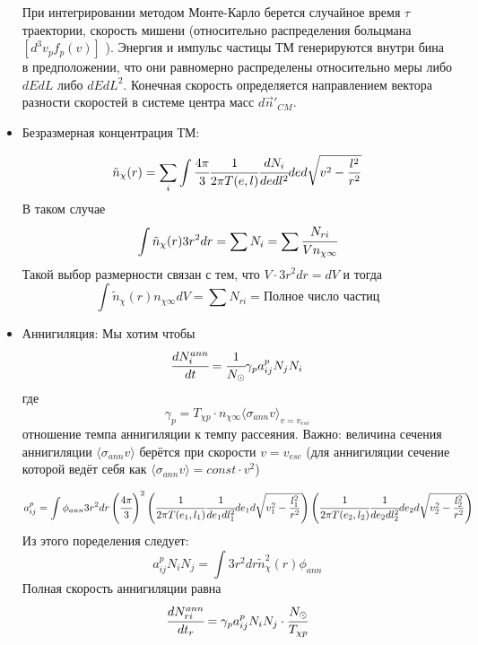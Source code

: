 \begin{itemize}
		При интегрировании методом Монте-Карло берется случайное время $\tau$ траектории, скорость мишени (относительно распределения больцмана $ \left[ d^3v_p f_p(v) \right]$ ). Энергия и импульс частицы ТМ генерируются внутри бина в предположении, что они равномерно распределены относительно меры либо $dEdL$ либо $dEdL^2$. Конечная скорость определяется направлением вектора разности скоростей в системе центра масс $d\vec{n}'_{CM}$.
		
		\item Безразмерная концентрация ТМ:
		
		\begin{equation*}
			\tilde{n}_{\chi}(r) = \sum_i{\int{\cfrac{4\pi}{3} \cfrac{1}{2\pi T(e,l)} \cfrac{dN_i}{dedl^2} de d\sqrt{v^2-\frac{l^2}{r^2}} }}
		\end{equation*}
		 В таком случае
		 \begin{equation*}
		 	\int{\tilde{n}_{\chi}(r) 3r^2dr} = \sum{N_i} = \sum{\cfrac{N_{ri}}{V n_{\chi \infty}}}
		 \end{equation*}
		 Такой выбор размерности связан с тем, что $V \cdot 3r^2dr = dV$ и тогда
		 \begin{equation*}
		 	\int{\tilde{n}_{\chi}(r) n_{\chi \infty} dV} = \sum{N_{ri}} = \text{Полное число частиц}
		 \end{equation*}
		\item Аннигиляция:
		Мы хотим чтобы
		\begin{equation}
			\cfrac{d N_{i}^{ann}}{dt} = \cfrac{1}{N_{\odot}}\gamma_p a^{p}_{ij} N_j N_i
		\end{equation}
		где 
		\begin{equation*}
			\gamma_p = T_{\chi p} \cdot n_{\chi \infty} \langle\sigma_{ann} v\rangle_{v = v_{esc}}
		\end{equation*}
		отношение темпа аннигиляции к темпу рассеяния. Важно: величина сечения аннигиляции $\langle\sigma_{ann} v\rangle$ берётся при скорости $v = v_{esc}$ (для аннигиляции сечение которой ведёт себя как $\langle\sigma_{ann} v\rangle = const\cdot v^2$)
		
		\begin{equation*}
			a_{ij}^p = \int{\phi_{ann} 3r^2dr\left(\cfrac{4\pi}{3}\right)^2 \left( \cfrac{1}{2\pi T(e_1,l_1)} \cfrac{1}{de_1dl_1^2} de_1 d\sqrt{v_1^2-\frac{l_1^2}{r^2}} \right) \left( \cfrac{1}{2\pi T(e_2,l_2)} \cfrac{1}{de_2dl_2^2} de_2 d\sqrt{v_2^2-\frac{l_2^2}{r^2}} \right)}
		\end{equation*}
		Из этого поределения следует:
		\begin{equation*}
			a_{ij}^p N_i N_j = \int{3r^2dr \tilde{n}^2_{\chi}(r) \phi_{ann}}
		\end{equation*}
		Полная скорость аннигиляции равна
		\begin{equation*}
			\cfrac{dN^{ann}_{ri}}{dt_r} = \gamma_p a_{ij}^p N_i N_j \cdot \cfrac{N_{\odot}}{T_{\chi p}}
		\end{equation*}
		
	\end{itemize}
 
